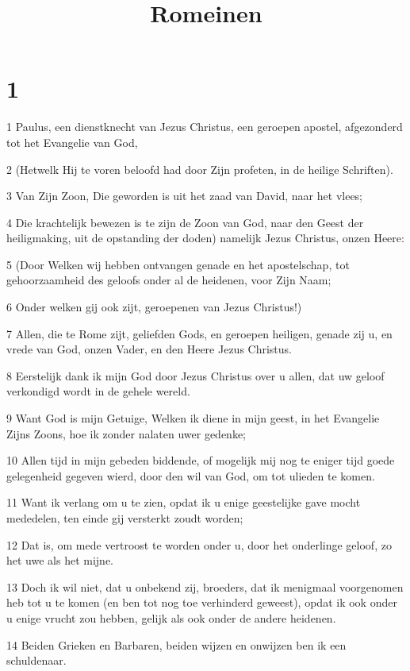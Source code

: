 

\title{Romeinen}



\chapter{1}

\par 1 Paulus, een dienstknecht van Jezus Christus, een geroepen apostel, afgezonderd tot het Evangelie van God,
\par 2 (Hetwelk Hij te voren beloofd had door Zijn profeten, in de heilige Schriften).
\par 3 Van Zijn Zoon, Die geworden is uit het zaad van David, naar het vlees;
\par 4 Die krachtelijk bewezen is te zijn de Zoon van God, naar den Geest der heiligmaking, uit de opstanding der doden) namelijk Jezus Christus, onzen Heere:
\par 5 (Door Welken wij hebben ontvangen genade en het apostelschap, tot gehoorzaamheid des geloofs onder al de heidenen, voor Zijn Naam;
\par 6 Onder welken gij ook zijt, geroepenen van Jezus Christus!)
\par 7 Allen, die te Rome zijt, geliefden Gods, en geroepen heiligen, genade zij u, en vrede van God, onzen Vader, en den Heere Jezus Christus.
\par 8 Eerstelijk dank ik mijn God door Jezus Christus over u allen, dat uw geloof verkondigd wordt in de gehele wereld.
\par 9 Want God is mijn Getuige, Welken ik diene in mijn geest, in het Evangelie Zijns Zoons, hoe ik zonder nalaten uwer gedenke;
\par 10 Allen tijd in mijn gebeden biddende, of mogelijk mij nog te eniger tijd goede gelegenheid gegeven wierd, door den wil van God, om tot ulieden te komen.
\par 11 Want ik verlang om u te zien, opdat ik u enige geestelijke gave mocht mededelen, ten einde gij versterkt zoudt worden;
\par 12 Dat is, om mede vertroost te worden onder u, door het onderlinge geloof, zo het uwe als het mijne.
\par 13 Doch ik wil niet, dat u onbekend zij, broeders, dat ik menigmaal voorgenomen heb tot u te komen (en ben tot nog toe verhinderd geweest), opdat ik ook onder u enige vrucht zou hebben, gelijk als ook onder de andere heidenen.
\par 14 Beiden Grieken en Barbaren, beiden wijzen en onwijzen ben ik een schuldenaar.
